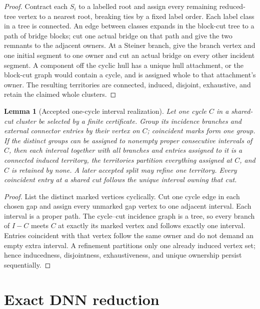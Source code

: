\documentclass[11pt]{article}
\newtheorem{lemma}[theorem]{Lemma}
\begin{document}
\begin{proof}
Contract each $S_i$ to a labelled root and assign every remaining reduced-tree
vertex to a nearest root, breaking ties by a fixed label order.  Each label
class in a tree is connected.  An edge between classes expands in the
block-cut tree to a path of bridge blocks; cut one actual bridge on that path
and give the two remnants to the adjacent owners.  At a Steiner branch, give
the branch vertex and one initial segment to one owner and cut an actual bridge
on every other incident segment.  A component off the cyclic hull has a unique
hull attachment, or the block-cut graph would contain a cycle, and is assigned
whole to that attachment's owner.  The resulting territories are connected,
induced, disjoint, exhaustive, and retain the claimed whole clusters.
\end{proof}

\begin{lemma}[Accepted one-cycle interval realization]\label{lem:ownership}
Let one cycle $C$ in a shared-cut cluster be selected by a finite certificate.
Group its incidence branches and external connector entries by their vertex on
$C$; coincident marks form one group.  If the distinct groups can be assigned
to nonempty proper consecutive intervals of $C$, then each interval together
with all branches and entries assigned to it is a connected induced territory,
the territories partition everything assigned at $C$, and $C$ is retained by
none.  A later accepted split may refine one territory.  Every coincident entry
at a shared cut follows the unique interval owning that cut.
\end{lemma}

\begin{proof}
List the distinct marked vertices cyclically.  Cut one cycle edge in each
chosen gap and assign every unmarked gap vertex to one adjacent interval.  Each
interval is a proper path.  The cycle--cut incidence graph is a tree, so every
branch of $I-C$ meets $C$ at exactly its marked vertex and follows exactly one
interval.  Entries coincident with that vertex follow the same owner and do
not demand an empty extra interval.  A refinement partitions only one already
induced vertex set; hence inducedness, disjointness, exhaustiveness, and unique
ownership persist sequentially.
\end{proof}

\section{Exact DNN reduction}
\end{document}
